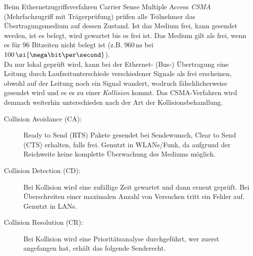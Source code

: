Beim Ethernetzugriffsverfahren Carrier Sense Multiple Access \emph{CSMA} (Mehrfachzugriff mit Trägerprüfung) prüfen alle Teilnehmer das Übertragungsmedium auf dessen Zustand. Ist das Medium frei, kann gesendet werden, ist es belegt, wird gewartet bis es frei ist. Das Medium gilt als frei, wenn es für 96 Bitzeiten nicht belegt ist (z.B. $960 \, \si{\nano\second}$ bei $100 \, \si{\mega\bit\per\second}$).\\

Da nur lokal geprüft wird, kann bei der Ethernet- (Bus-) Übertragung eine Leitung durch Laufzeitunterschiede verschiedener Signale als frei erscheinen, obwohl auf der Leitung noch ein Signal \glqq wandert\grqq, wodruch fälschlicherweise gesendet wird und es es zu einer \emph{Kollision} kommt. Das CSMA-Verfahren wird demnach weiterhin unterschieden nach der Art der Kollisionsbehandlung.

\begin{description}
\item[Collision Avoidance (CA):] Ready to Send (RTS) Pakete gesendet bei Sendewunsch, Clear to Send (CTS) erhalten, falls frei. Genutzt in WLANs/Funk, da aufgrund der Reichweite keine komplette Überwachung des Mediums möglich.
\item[Collision Detection (CD):] Bei Kollision wird eine zufällige Zeit gewartet und dann erneut geprüft. Bei Überschreiten einer maximalen Anzahl von Versuchen tritt ein Fehler auf. Genutzt in LANs.
\item[Collision Resolution (CR):] Bei Kollision wird eine Prioritätsanalyse durchgeführt, wer zuerst angefangen hat, erhält das folgende Senderecht.
\end{description}
